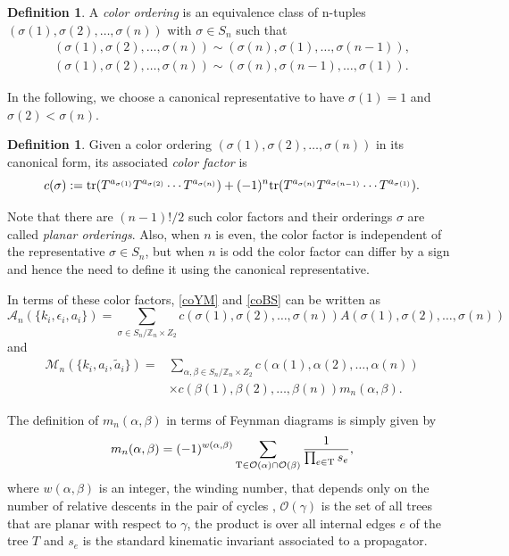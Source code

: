 \documentclass[pdftex]{sigma}
\theoremstyle{definition}
\newtheorem{defn}[thm]{Definition}
\numberwithin{equation}{section}
\begin{document}
\begin{defn}\label{stdCO}
A {\it color ordering} is an equivalence class of n-tuples $(\sigma(1),\sigma(2),\dots, \sigma(n))$ with $\sigma\in S_n$ such that
\begin{align*}
 (\sigma(1),\sigma(2),\dots, \sigma(n))\sim (\sigma(n),\sigma(1),\dots, \sigma(n-1)),\\ (\sigma(1),\sigma(2),\dots, \sigma(n))\sim (\sigma(n),\sigma(n-1),\dots, \sigma(1)).
\end{align*}
\end{defn}

In the following, we choose a canonical representative to have $\sigma(1)=1$ and $\sigma(2)< \sigma(n)$.

\begin{defn}\label{stdCF}
Given a color ordering $(\sigma(1),\sigma(2),\dots, \sigma(n))$ in its canonical form, its associated {\it color factor} is
%
\begin{equation*}%
 c(\sigma ):= {\rm tr}(T^{a_{\sigma (1)}}T^{a_{\sigma(2)}}\cdots T^{a_{\sigma(n)}}) + (-1)^n {\rm tr}( T^{a_{\sigma (n)}}T^{a_{\sigma(n-1)}}\cdots T^{a_{\sigma(1)}}).
\end{equation*}
%
	\end{defn}

Note that there are $(n-1)!/2$ such color factors and their orderings $\sigma$ are called {\it planar orderings}. Also, when $n$ is even, the color factor is independent of the representative $\sigma\in S_n$, but when $n$ is odd the color factor can differ by a sign and hence the need to define it using the canonical representative.

In terms of these color factors, \eqref{coYM} and \eqref{coBS} can be written as
%
\begin{equation}\label{coYM2}
 {\mathcal A}_n(\{ k_i,\epsilon_i,a_i\} ) = \sum_{\sigma \in S_{n}/{\mathbb{Z}_n\times Z_2}} c(\sigma(1),\sigma(2),\dots ,\sigma(n) )A(\sigma(1),\sigma(2),\dots ,\sigma(n))
\end{equation}
%
and
%
\begin{align}
 {\mathcal M}_n(\{ k_i,a_i,{\tilde a}_i\} ) ={}& \sum_{\alpha,\beta \in S_{n}/{\mathbb{Z}_n\times Z_2}}c(\alpha(1),\alpha(2),\dots ,\alpha(n))\nonumber\\
 &\times c(\beta(1),\beta(2),\dots ,\beta(n)) m_n(\alpha,\beta).\label{coBS2}
\end{align}
%

The definition of $m_n(\alpha,\beta)$ in terms of Feynman diagrams is simply given by \cite{Cachazo:2013iea}
%
\begin{equation*}%
 m_n(\alpha,\beta) = (-1)^{w(\alpha, \beta)}\sum_{{\rm T}\in {\mathcal O}(\alpha)\cap {\mathcal O}(\beta)} \frac{1}{\prod_{e\in {\rm T}}s_e} ,
\end{equation*}
%
where $w(\alpha, \beta)$ is an integer, the winding number, that depends only on the number of relative descents in the pair of cycles \cite{Mafra:2016ltu},
${\mathcal O}(\gamma)$ is the set of all trees that are planar with respect to $\gamma$, the product is over all internal edges $e$ of the tree $T$ and $s_e$ is the standard kinematic invariant associated to a propagator.
\end{document}
